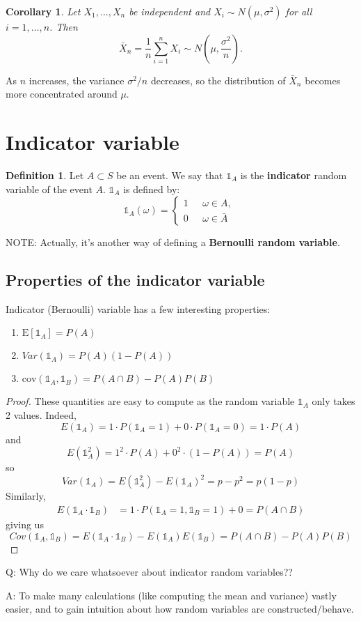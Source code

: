 \documentclass[
]{book}
\providecommand{\tightlist}{%
  \setlength{\itemsep}{0pt}\setlength{\parskip}{0pt}}
\newtheorem{corollary}{Corollary}[chapter]
\theoremstyle{definition}
\newtheorem{definition}{Definition}[chapter]
\theoremstyle{definition}
\theoremstyle{definition}
\theoremstyle{definition}
\theoremstyle{remark}
\begin{document}
\begin{corollary}
Let \(X_1,\dots,X_n\) be independent and \(X_i\sim N(\mu,\sigma^2)\) for all \(i=1,\dots,n\). Then
\[\bar{X}_n = \frac{1}{n} \sum_{i=1}^n X_i \sim N\left(\mu, \frac{\sigma^2}{n}\right). \]
\end{corollary}

As \(n\) increases, the variance \(\sigma^2/n\) decreases, so the distribution of \(\bar{X}_n\) becomes more concentrated around \(\mu\).

\section{Indicator variable}\label{indicator-variable}

\begin{definition}
Let \(A \subset S\) be an event. We say that \(\mathbb{1}_{ A}\) is the \textbf{indicator} random variable of the event \(A\). \(\mathbb{1}_{ A}\) is defined by:
\pause
\[ \mathbb{1}_{ A}(\omega) =\begin{cases}
      1 & \mbox{ $\omega \in A$,} \\
      0 & \mbox{ $\omega \in \bar{A}$ }
   \end{cases}
\]
\end{definition}

NOTE: Actually, it's another way of defining a \textbf{Bernoulli random variable}.

\subsection{Properties of the indicator variable}\label{properties-of-the-indicator-variable}

Indicator (Bernoulli) variable has a few interesting properties:

\begin{enumerate}
\def\labelenumi{\arabic{enumi}.}
\tightlist
\item
  \(\mbox{E}[\mathbb{1}_A] = P(A)\)
\item
  \(Var(\mathbb{1}_A) = P(A)(1-P(A))\)
\item
  \(\mbox{cov}(\mathbb{1}_A,\mathbb{1}_B) = P(A\cap B ) - P(A)P(B)\)
\end{enumerate}

\begin{proof}
These quantities are easy to compute as the random variable \(\mathbb{1}_A\) only takes 2 values. Indeed,
\[E(\mathbb{1}_A) = 1 \cdot P(\mathbb{1}_A = 1) + 0 \cdot P(\mathbb{1}_A=0) = 1 \cdot P(A) \]
and
\[E(\mathbb{1}_A^2) = 1^2 \cdot P(A) + 0^2 \cdot (1-P(A)) = P(A)\]
so
\[ Var(\mathbb{1}_A)=E(\mathbb{1}_A^2)-E(\mathbb{1}_A)^2=p-p^2=p(1-p)\]
Similarly,
\begin{align*}
    E(\mathbb{1}_A\cdot \mathbb{1}_B) &= 1\cdot P(\mathbb{1}_A =1,\mathbb{1}_B=1)+0=P(A\cap B)\end{align*}
giving us
\[ Cov(\mathbb{1}_A,\mathbb{1}_B)=E(\mathbb{1}_A\cdot \mathbb{1}_B)-E(\mathbb{1}_A)E(\mathbb{1}_B)=P(A\cap B)-P(A)P(B)\]
\end{proof}

Q: Why do we care whatsoever about indicator random variables??

A: To make many calculations (like computing the mean and variance) vastly easier, and to gain intuition about how random variables are constructed/behave.

  
\end{document}
